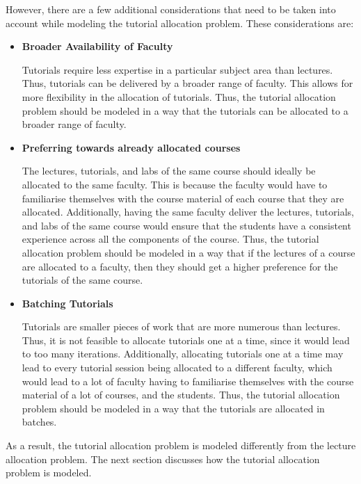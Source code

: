However, there are a few additional considerations that need to be taken into account while modeling the tutorial allocation problem. These considerations are:

\begin{itemize}
  \item \textbf{Broader Availability of Faculty}

        Tutorials require less expertise in a particular subject area than lectures. Thus, tutorials can be delivered by a broader range of faculty. This allows for more flexibility in the allocation of tutorials. Thus, the tutorial allocation problem should be modeled in a way that the tutorials can be allocated to a broader range of faculty.

  \item \textbf{Preferring towards already allocated courses}

        The lectures, tutorials, and labs of the same course should ideally be allocated to the same faculty. This is because the faculty would have to familiarise themselves with the course material of each course that they are allocated. Additionally, having the same faculty deliver the lectures, tutorials, and labs of the same course would ensure that the students have a consistent experience across all the components of the course. Thus, the tutorial allocation problem should be modeled in a way that if the lectures of a course are allocated to a faculty, then they should get a higher preference for the tutorials of the same course.

  \item \textbf{Batching Tutorials}

        Tutorials are smaller pieces of work that are more numerous than lectures. Thus, it is not feasible to allocate tutorials one at a time, since it would lead to too many iterations. Additionally, allocating tutorials one at a time may lead to every tutorial session being allocated to a different faculty, which would lead to a lot of faculty having to familiarise themselves with the course material of a lot of courses, and the students. Thus, the tutorial allocation problem should be modeled in a way that the tutorials are allocated in batches.

\end{itemize}

As a result, the tutorial allocation problem is modeled differently from the lecture allocation problem. The next section discusses how the tutorial allocation problem is modeled.

